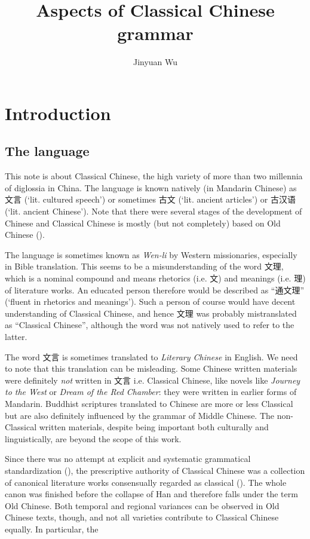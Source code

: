 \documentclass[UTF8, a4paper, oneside, scheme=plain, 12pt]{ctexrep}
\title{Aspects of Classical Chinese grammar}
\author{Jinyuan Wu}
\newcommand*{\term}[1]{\emph{#1}}
\newcommand{\form}[1]{\emph{#1}}
\newcommand{\work}[1]{\textit{#1}}
\newcommand{\translate}[1]{`#1'}
\begin{document}
\automath

\maketitle

\chapter{Introduction}

\section{The language}

This note is about Classical Chinese,
the high variety of more than two millennia of diglossia in China.
The language is known natively (in Mandarin Chinese) as 文言 (\translate{lit. cultured speech})
or sometimes 古文 (\translate{lit. ancient articles})
or 古汉语 (\translate{lit. ancient Chinese}).
Note that there were several stages of the development of Chinese
and Classical Chinese is mostly (but not completely) based on Old Chinese
().

The language is sometimes known as \form{Wen-li} by Western missionaries,
especially in Bible translation.
This seems to be a misunderstanding of the word 文理,
which is a nominal compound and means rhetorics (i.e. 文) and meanings (i.e. 理) of literature works.
An educated person therefore would be described as ``通文理'' (\translate{fluent in rhetorics and meanings}).
Such a person of course would have decent understanding of Classical Chinese,
and hence 文理 was probably mistranslated as ``Classical Chinese'',
although the word was not natively used to refer to the latter.

The word 文言 is sometimes translated to \term{Literary Chinese} in English.
We need to note that this translation can be misleading.
Some Chinese written materials were definitely \emph{not} written in 文言 i.e. Classical Chinese,
like novels like \work{Journey to the West} or \work{Dream of the Red Chamber}:
they were written in earlier forms of Mandarin.
Buddhist scriptures translated to Chinese are more or less Classical
but are also definitely influenced by the grammar of Middle Chinese.
The non-Classical written materials, despite being important both culturally and linguistically,
are beyond the scope of this work.

Since there was no attempt at explicit and systematic grammatical standardization
(),
the prescriptive authority of Classical Chinese was a collection of canonical literature works
consensually regarded as classical ().
The whole canon was finished before the collapse of Han
and therefore falls under the term Old Chinese.
Both temporal and regional variances can be observed in Old Chinese texts, though,
and not all varieties contribute to Classical Chinese equally.
In particular, the 
\end{document}
